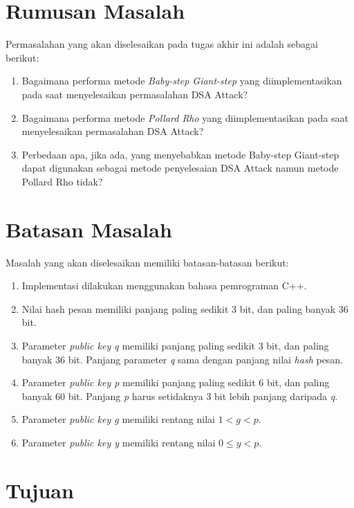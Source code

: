 \section {Rumusan Masalah}

Permasalahan yang akan diselesaikan pada tugas akhir ini adalah sebagai berikut:

\begin {enumerate}
\item Bagaimana performa metode \textit{Baby-step Giant-step} yang diimplementasikan pada saat menyelesaikan permasalahan DSA Attack?
\item Bagaimana performa metode \textit{Pollard Rho} yang diimplementasikan pada saat menyelesaikan permasalahan DSA Attack?
\item Perbedaan apa, jika ada, yang menyebabkan metode Baby-step Giant-step dapat digunakan sebagai metode penyelesaian DSA Attack namun metode Pollard Rho tidak?
\end {enumerate}

\section {Batasan Masalah}

Masalah yang akan diselesaikan memiliki batasan-batasan berikut:

\begin {enumerate}
\item Implementasi dilakukan menggunakan bahasa pemrograman C++.
\item Nilai hash pesan memiliki panjang paling sedikit 3 bit, dan paling banyak 36 bit. 
\item Parameter \textit{public key q} memiliki panjang paling sedikit 3 bit, dan paling banyak 36 bit. Panjang parameter \textit{q} sama dengan panjang nilai \textit{hash} pesan.
\item Parameter \textit{public key p} memiliki panjang paling sedikit 6 bit, dan paling banyak 60 bit. Panjang \textit{p} harus setidaknya 3 bit lebih panjang daripada \textit{q}.
\item Parameter \textit{public key g} memiliki rentang nilai $1 < g < p$.
\item Parameter \textit{public key y} memiliki rentang nilai $0 \leq y < p$.
\end {enumerate}

\section {Tujuan}

